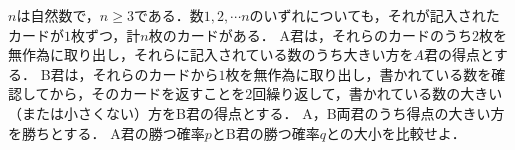 $n$は自然数で，$n\ge 3$である．数$1, 2,\cdots n$のいずれについても，それが記入されたカードが$1$枚ずつ，計$n$枚のカードがある．
A君は，それらのカードのうち$2$枚を無作為に取り出し，それらに記入されている数のうち大きい方を$A$君の得点とする．
B君は，それらのカードから$1$枚を無作為に取り出し，書かれている数を確認してから，そのカードを返すことを$2$回繰り返して，書かれている数の大きい（または小さくない）方をB君の得点とする．
A，B両君のうち得点の大きい方を勝ちとする．
A君の勝つ確率$p$とB君の勝つ確率$q$との大小を比較せよ．
